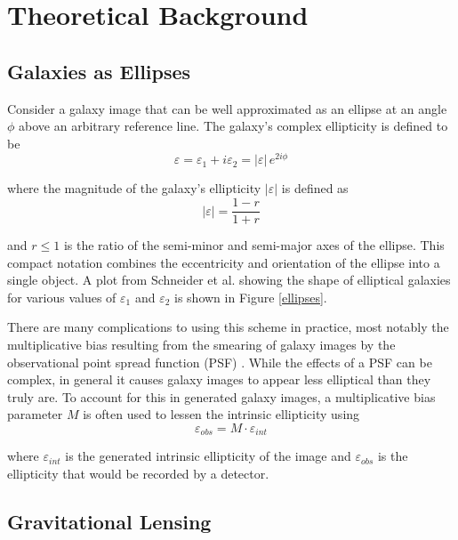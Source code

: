 \documentclass[%
 reprint,
 amsmath,amssymb,
 aps,nofootinbib
]{revtex4-1}
\begin{document}
\section{Theoretical Background}

\subsection*{Galaxies as Ellipses}
Consider a galaxy image that can be well approximated as an ellipse at an angle $\phi$ above an arbitrary reference line. The galaxy's complex ellipticity is defined to be
\begin{equation}\label{complex_ellipticity}
\varepsilon=\varepsilon_1+i\varepsilon_2=|\varepsilon|\,e^{2i\phi}
\end{equation}

\noindent where the magnitude of the galaxy's ellipticity $|\varepsilon|$ is defined as
\begin{equation}
|\varepsilon|=\frac{1-r}{1+r}
\end{equation}

\noindent and $r\leq1$ is the ratio of the semi-minor and semi-major axes of the ellipse. This compact notation combines the eccentricity and orientation of the ellipse into a single object. A plot from Schneider et al. \cite{schneider} showing the shape of elliptical galaxies for various values of $\varepsilon_1$ and $\varepsilon_2$ is shown in Figure \ref{ellipses}.

There are many complications to using this scheme in practice, most notably the multiplicative bias resulting from the smearing of galaxy images by the observational point spread function (PSF) \cite{multiplicative_bias}. While the effects of a PSF can be complex, in general it causes galaxy images to appear less elliptical than they truly are. To account for this in generated galaxy images, a multiplicative bias parameter $M$ is often used to lessen the intrinsic ellipticity using
$$\varepsilon_{obs}=M\cdot\varepsilon_{int}$$

\noindent where $\varepsilon_{int}$ is the generated intrinsic ellipticity of the image and $\varepsilon_{obs}$ is the ellipticity that would be recorded by a detector.

\subsection*{Gravitational Lensing}
\end{document}
